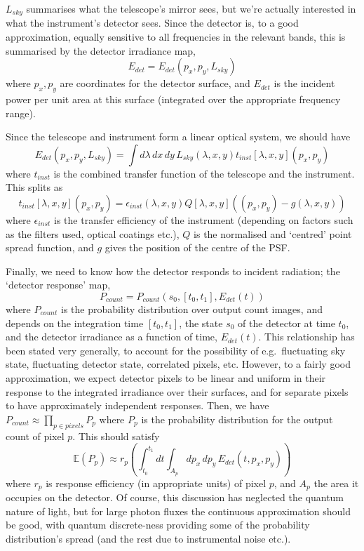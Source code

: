$L_{sky}$ summarises what the telescope's mirror sees, but we're
actually interested in what the instrument's detector sees. Since
the detector is, to a good approximation, equally sensitive to all
frequencies in the relevant bands, this is summarised by the detector irradiance map,
\[
E_{det} = E_{det} (p_x, p_y, L_{sky})
\]
where $p_x, p_y$ are coordinates for the detector surface, and
$E_{det}$ is the incident power per unit area at this surface
(integrated over the appropriate frequency range).

Since the telescope and instrument form a linear optical system,
we should have
\[
E_{det}(p_x, p_y, L_{sky}) = \int d\lambda\, dx\, dy\, L_{sky}(\lambda, x, y) t_{inst}[\lambda, x, y](p_x, p_y)
\]
where $t_{inst}$ is the combined transfer function of the telescope and the instrument.
This splits as 
\[
t_{inst}[\lambda,x, y](p_x, p_y) = \epsilon_{inst} (\lambda, x, y)
Q[\lambda, x, y]((p_x, p_y) - g (\lambda, x, y))
\]
where $\epsilon_{inst}$ is the transfer efficiency of the instrument
(depending on factors such as the filters used, optical coatings etc.),
$Q$ is the normalised and `centred' point spread function, and $g$ gives
the position of the centre of the PSF.

Finally, we need to know how the detector responds to incident radiation;
the `detector response' map,
\[
P_{count} = P_{count} (s_0, [t_0, t_1], E_{det}(t))
\]
where $P_{count}$ is the probability distribution over output count images,
and depends on the integration time $[t_0, t_1]$, the state $s_0$ of the detector
at time $t_0$, and the detector irradiance as a function of time, $E_{det}(t)$.
This relationship has been stated very generally, to account for the possibility
of e.g.\ fluctuating sky state, fluctuating detector state, correlated pixels, etc.
However, to a fairly good approximation, we expect detector pixels to be linear
and uniform in their response to the integrated irradiance over their surfaces,
and for separate pixels to have approximately independent responses. Then,
we have
$P_{count} \approx \prod_{p \in pixels} P_p$
where $P_p$ is the probability distribution for the output count of pixel $p$.
This should satisfy
\[
\mathbb{E}(P_p) \approx r_p \left (\int_{t_0}^{t_1} dt \int_{A_p} dp_x\, dp_y\, E_{det}(t, p_x, p_y)\right)
\]
where $r_p$ is response efficiency (in appropriate units) of pixel
$p$, and $A_p$ the area it occupies on the detector. Of course, this
discussion has neglected the quantum nature of light, but for large
photon fluxes the continuous approximation should be good, with quantum
discrete-ness providing some of the probability distribution's spread
(and the rest due to instrumental noise etc.).

